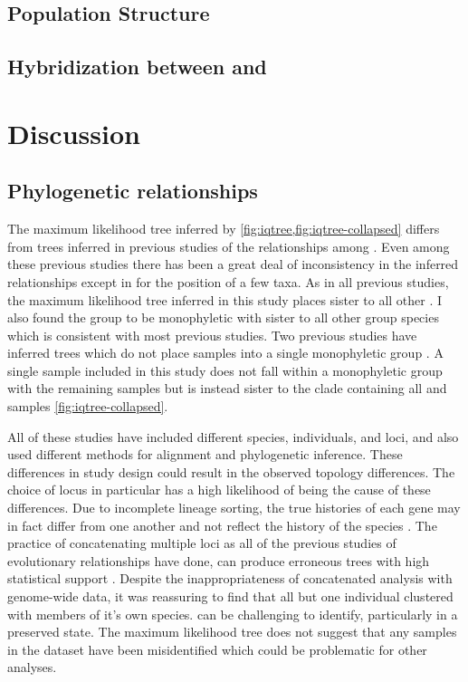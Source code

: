 \subsection{Population Structure}

\subsection{Hybridization between \fowl and \wood}


\section{Discussion}

\subsection{Phylogenetic relationships}
The maximum likelihood tree inferred by \iqtree \cref{fig:iqtree,fig:iqtree-collapsed} 
differs from trees inferred in previous studies of the relationships 
among \anaxyrus \parencite{fontenot2011,graybeal1997,masta2002,pramuk2007,pyron2011,portik2023}.
Even among these previous studies there has been a great deal of inconsistency in
the inferred relationships except in for the position of a few taxa.
As in all previous studies, the maximum likelihood tree inferred in this 
study places \punctatus sister to all other \anaxyrus.
I also found the \americanus group to be monophyletic with \microscaphus sister  
to all other \americanus group species which is consistent with most previous studies.
Two previous studies have inferred trees which do not place \fowl samples
into a single monophyletic group \parencite{masta2002,fontenot2011}.
A single \fowl sample included in this study does not fall within a monophyletic 
group with the remaining \fowl samples but is instead sister to the clade 
containing all \fowl and \wood samples \cref{fig:iqtree-collapsed}.

All of these studies have included different species, individuals, and loci, and 
also used different methods for alignment and phylogenetic inference. 
These differences in study design could result in the observed topology differences. 
The choice of locus in particular has a high likelihood of being the cause of these differences. 
Due to incomplete lineage sorting, the true histories of each gene may in fact 
differ from one another and not reflect the history of the species \parencite{kingman1982}. 
The practice of concatenating multiple loci as all of the previous studies of
\anaxyrus evolutionary relationships have done, can produce erroneous trees  
with high statistical support \parencite{kubatko2007}.
Despite the inappropriateness of concatenated analysis with genome-wide data,
it was reassuring to find that all but one individual clustered with members
of it's own species. 
\anaxyrus can be challenging to identify, particularly in a preserved state. 
The maximum likelihood tree does not suggest that any samples in the dataset 
have been misidentified which could be problematic for other analyses.

